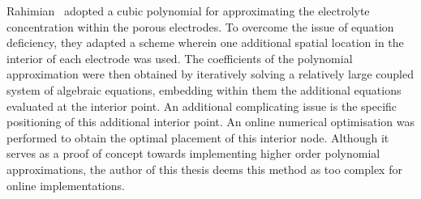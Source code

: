 Rahimian~\etal{} adopted  a cubic  polynomial for approximating  the electrolyte
concentration within  the porous electrodes.  To overcome the issue  of equation
deficiency, they adapted a scheme wherein one additional spatial location in the
interior  of  each  electrode  was  used. The  coefficients  of  the  polynomial
approximation  were then  obtained  by iteratively  solving  a relatively  large
coupled  system of  algebraic equations,  embedding within  them the  additional
equations evaluated at  the interior point. An additional  complicating issue is
the specific positioning of this  additional interior point. An online numerical
optimisation  was performed  to obtain  the optimal  placement of  this interior
node. Although it serves as a proof of concept towards implementing higher order
polynomial approximations,  the author of this  thesis deems this method  as too
complex for online implementations.



